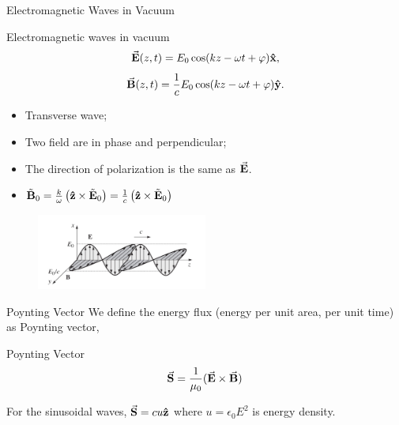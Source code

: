 \documentclass{beamer}
\begin{document}
\begin{frame}{Electromagnetic Waves in Vacuum}
    \begin{block}{Electromagnetic waves in vacuum}
        \begin{equation}
            \va{E}(z, t) = E_0 \cos(kz - \omega t + \varphi) \vu{x},
        \end{equation}
        \begin{equation}
            \va{B}(z, t) = \frac{1}{c}E_0 \cos(kz - \omega t + \varphi) \vu{y}.
        \end{equation}
    \end{block}
    \begin{itemize}
        \item Transverse wave;
        \item Two field are in phase and perpendicular;
        \item The direction of polarization is the same as $\va{E}$.
        \item $\tilde{\vb{B}}_0 = \frac{k}{\omega} \left(\vu{z} \times \tilde{\vb{E}}_0 \right) = \frac{1}{c} \left(\vu{z} \times \tilde{\vb{E}}_0 \right)$
    \end{itemize}

    \begin{figure}[htbp]
        \centering
        \includegraphics[width=0.5\textwidth]{Images/emwave.jpg}
    \end{figure}
\end{frame}

\begin{frame}{Poynting Vector}
    We define the energy flux (energy per unit area, per unit time) as Poynting vector,

    \begin{block}{Poynting Vector}
        \begin{equation}
            \va{S} = \frac{1}{\mu_0} (\va{E} \times \va{B})
        \end{equation}
    \end{block}

    For the sinusoidal waves, $\va{S} = cu \vu{z}$ where $u = \epsilon_0 E^2$ is energy density.
\end{frame}
\end{document}
